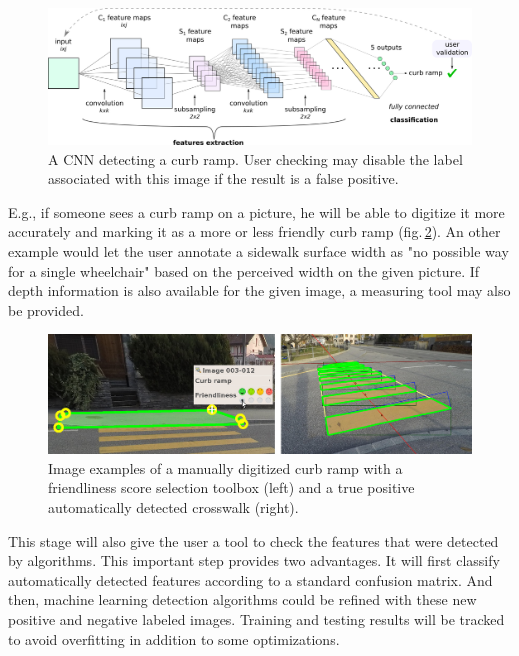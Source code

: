 \documentclass[10pt,conference,a4paper]{IEEEtran}
\begin{document}
\begin{figure}[ht]
\begin{center}
\includegraphics[width=1.0\linewidth]{architecture.png}
\end{center}
   \caption{A CNN detecting a curb ramp. User checking may disable the label associated with this image if the result is a false positive.}\label{cnn}
\end{figure}


E.g., if someone sees a curb ramp on a picture, he will be able to digitize it more accurately and marking it as a more or less friendly curb ramp (fig.\,\ref{curbramppicture}). An other example would let the user annotate a sidewalk surface width as %
"no possible way for a single wheelchair" based on the perceived width on the given picture. If depth information is also available for the given image, 
a measuring tool may also be provided.



\begin{figure}[ht]
\begin{center}
\includegraphics[width=1.0\linewidth]{curb_ramp_crosswalk01.jpg}
\end{center}
   \caption{Image examples of a manually digitized curb ramp with a friendliness score selection toolbox (left) and a true positive automatically detected crosswalk (right).}\label{curbramppicture}
\end{figure}


This stage will also give the user a tool to check the features that were detected by algorithms. This important step provides two advantages. It will first classify automatically detected features according to a standard confusion matrix. And then, machine learning detection algorithms could be refined with these new positive and negative labeled images. Training and testing results will be tracked to avoid overfitting in addition to some optimizations.
\end{document}
